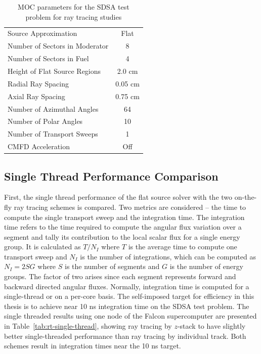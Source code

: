 \begin{table}[ht]
	\centering
	\caption{MOC parameters for the SDSA test problem for ray tracing studies}
	\medskip
	\begin{tabular}{lc}
		\hline
		Source Approximation & Flat \\
		Number of Sectors in Moderator & 8 \\
		Number of Sectors in Fuel & 4 \\
		Height of Flat Source Regions & 2.0 cm \\
		Radial Ray Spacing & 0.05 cm \\
		Axial Ray Spacing & 0.75 cm \\
		Number of Azimuthal Angles & 64 \\
		Number of Polar Angles & 10 \\
		Number of Transport Sweeps & 1 \\
		CMFD Acceleration & Off \\
		\hline
	\end{tabular}
	\label{tab:sdsa-rt-flat}
\end{table}

\subsection{Single Thread Performance Comparison}

First, the single thread performance of the flat source solver with the two on-the-fly ray tracing schemes is compared. Two metrics are considered -- the time to compute the single transport sweep and the integration time. The integration time refers to the time required to compute the angular flux variation over a segment and tally its contribution to the local scalar flux for a single energy group. It is calculated as $T / N_I$ where $T$ is the average time to compute one transport sweep and $N_I$ is the number of integrations, which can be computed as $N_I = 2 S G$ where $S$ is the number of segments and $G$ is the number of energy groups. The factor of two arises since each segment represents forward and backward directed angular fluxes. Normally, integration time is computed for a single-thread or on a per-core basis. The self-imposed target for efficiency in this thesis is to achieve near 10 ns integration time on the SDSA test problem. The single threaded results using one node of the Falcon supercomputer are presented in Table~\ref{tab:rt-single-thread}, showing ray tracing by $z$-stack to have slightly better single-threaded performance than ray tracing by individual track. Both schemes result in integration times near the 10 ns target.

